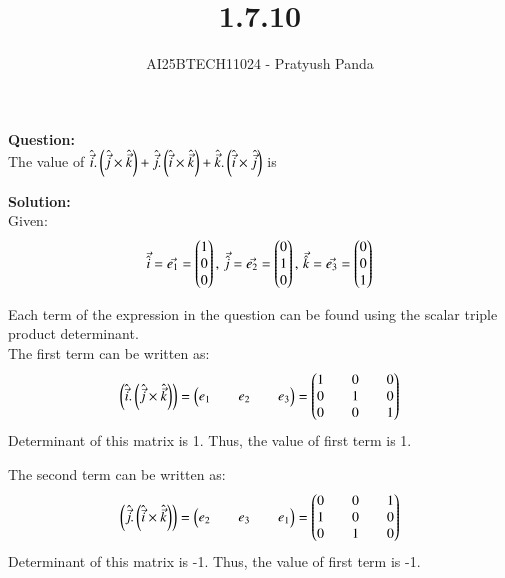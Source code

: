 \documentclass[journal]{IEEEtran}
\begin{document}

\vspace{3cm}

\title{1.7.10}
\author{AI25BTECH11024 - Pratyush Panda
}
\maketitle
{\let\newpage\relax\maketitle}

\renewcommand{\thefigure}{\theenumi}
\renewcommand{\thetable}{\theenumi}
\setlength{\intextsep}{10pt} %


\renewcommand{\thetable}{\theenumi}

\textbf{Question: } \\
The value of $\hat{\Vec{i}}.\left(\hat{\Vec{j}} \times \hat{\Vec{k}}\right) + \hat{\Vec{j}}.\left(\hat{\Vec{i}} \times \hat{\Vec{k}}\right) + \hat{\Vec{k}}.\left(\hat{\Vec{i}} \times \hat{\Vec{j}}\right)$ is \underline{\hspace{2cm}}
\vspace{0.5cm}

\textbf{Solution: } \\
Given:
\begin{align}
\Vec{\hat{i}}=\Vec{e_1}=\begin{pmatrix}1 \\ 0 \\ 0\end{pmatrix}, \, \Vec{\hat{j}}=\Vec{e_2}=\begin{pmatrix}0 \\ 1 \\ 0\end{pmatrix}, \, \Vec{\hat{k}}=\Vec{e_3}=\begin{pmatrix}0 \\ 0 \\ 1\end{pmatrix}
\end{align}

Each term of the expression in the question can be found using the scalar triple product determinant.\\
The first term can be written as:
\begin{align}
\left(\hat{\Vec{i}}.\left(\hat{\Vec{j}} \times \hat{\Vec{k}}\right)\right) = 
\begin{pmatrix}e_1 && e_2 && e_3\end{pmatrix} =
\begin{pmatrix}1 && 0 && 0 \\
       0 && 1 && 0 \\
       0 && 0 && 1\end{pmatrix}
\end{align}
Determinant of this matrix is 1. Thus, the value of first term is 1.

The second term can be written as:
\begin{align}
\left(\hat{\Vec{j}}.\left(\hat{\Vec{i}} \times \hat{\Vec{k}}\right)\right) = 
\begin{pmatrix}e_2 && e_3 && e_1\end{pmatrix} =
\begin{pmatrix}0 && 0 && 1 \\
       1 && 0 && 0 \\
       0 && 1 && 0\end{pmatrix}
\end{align}
Determinant of this matrix is -1. Thus, the value of first term is -1.
\end{document}
